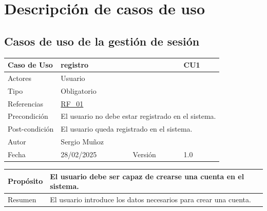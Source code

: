 \chapter{Descripción de casos de uso}
\label{anexo:casos_de_uso}

\section{Casos de uso de la gestión de sesión}

\begin{table}[H]
	\centering
	\begin{tabular}{| m{} | m{} | m{} | m{} |}
		\hline
		\rowcolor[HTML]{C0C0C0} Caso de Uso & \multicolumn{2}{|m{0.43\textwidth}|}{registro} &  CU1\\ 
		\hline
		Actores & \multicolumn{3}{l|}{Usuario} \\ 
		\hline
		Tipo & \multicolumn{3}{l|}{Obligatorio} \\ 
		\hline
		Referencias & \multicolumn{3}{l|}{\hyperref[req:RF01]{RF\_01}} \\ 
		\hline
		Precondición & \multicolumn{3}{l|}{El usuario no debe estar registrado en el sistema.} \\ 
		\hline
        Post-condición & \multicolumn{3}{l|}{El usuario queda registrado en el sistema.} \\ 
		\hline
		Autor & \multicolumn{3}{l|}{Sergio Muñoz} \\ 
		\hline
		Fecha & 28/02/2025 & Versión & 1.0 \\
		\hline
	\end{tabular}
\end{table}

\begin{table}[H]
	\centering
	\begin{tabular}{| m{} | m{} | m{} | m{} |}
		\hline
		Propósito & \multicolumn{3}{m{0.67\textwidth}|}{El usuario debe ser capaz de crearse una cuenta en el sistema.}   \\ 
		\hline
		Resumen & \multicolumn{3}{m{0.67\textwidth}|}{El usuario introduce los datos necesarios para crear una cuenta.} \\ 
		\hline
	\end{tabular}
\end{table}

